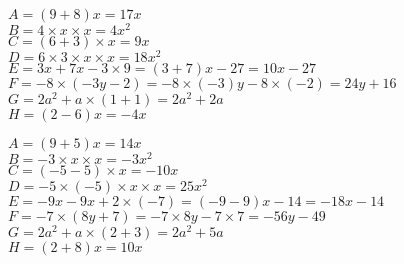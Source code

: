 \documentclass[a4paper,11pt,fleqn]{article}		%
\begin{document}
\begin{correction}
\begin{multicols}{2}

$A=(9  +8) x=17 x$\\
$B=4 \times x\times x=4 x^2$\\
$C=(6 +3) \times x=9  x$\\
$D=6\times 3\times x\times x=18 x^2$\\
$E= 3  x +7 x -3\times 9 = (3  +7) x -27 = 10 x -27 $\\
$F=-8 \times (-3y -2)  =-8 \times (-3)y -8 \times (-2)
 =24y +16 $\\
$G=2 a^2+a\times (1+ 1)=2 a^2+2a$\\
$H= (2 -6)x = -4x$


$A=(9  +5) x=14 x$\\
$B=-3 \times x\times x=-3 x^2$\\
$C=(-5 -5) \times x=-10  x$\\
$D=-5\times (-5)\times x\times x=25 x^2$\\
$E= -9  x -9 x +2\times (-7) = (-9  -9) x -14 = -18 x -14 $\\
$F=-7 \times (8y +7)  =-7 \times 8y -7 \times 7
 =-56y -49 $\\
$G=2 a^2+a\times (2+ 3)=2 a^2+5a$\\
$H= (2 +8)x = 10x$



\end{multicols}
\end{correction}
\end{document}
